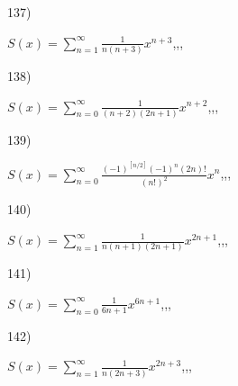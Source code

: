\documentclass[11pt, ukrainian]{article}
\begin{document}
\par
\newpage
137) \space 
{%
{$S(x)=\sum\limits_{n=1}^{\infty}{\frac{1}{n(n+3)}}{x^{{n+3}}}$},,, \par \smallskip  
}
\par
\vspace{0.9cm}
138) \space 
{%
{$S(x)=\sum\limits_{n=0}^{\infty}{\frac{1}{(n+2)(2n+1)}}{x^{{n+2}}}$},,, \par \smallskip  
}
\par
\vspace{0.9cm}
139) \space 
{%
{$S(x)=\sum\limits_{n=0}^{\infty}{\frac{{(-1)^{[n/2]}}{(-1)^n}(2n)!}{(n!)^2}}{x^{n}}$},,, \par \smallskip  
}
\par
\vspace{0.9cm}
140) \space 
{%
{$S(x)=\sum\limits_{n=1}^{\infty}{\frac{1}{n(n+1)(2n+1)}}{x^{{2n+1}}}$},,, \par \smallskip  
}
\par
\vspace{0.9cm}
141) \space 
{%
{$S(x)=\sum\limits_{n=0}^{\infty}{\frac{1}{6n+1}}{x^{{6n+1}}}$},,, \par \smallskip  
}
\par
\vspace{0.9cm}
142) \space 
{%
{$S(x)=\sum\limits_{n=1}^{\infty}{\frac{1}{n(2n+3)}}{x^{{2n+3}}}$},,, \par \smallskip  
}
\end{document}
